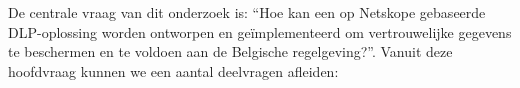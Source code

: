 
\section{}%
\label{sec:onderzoeksvraag}

De centrale vraag van dit onderzoek is: “Hoe kan een op Netskope gebaseerde DLP-oplossing worden ontworpen en geïmplementeerd om vertrouwelijke gegevens te beschermen en te voldoen aan de Belgische regelgeving?”. 
Vanuit deze hoofdvraag kunnen we een aantal deelvragen afleiden:

